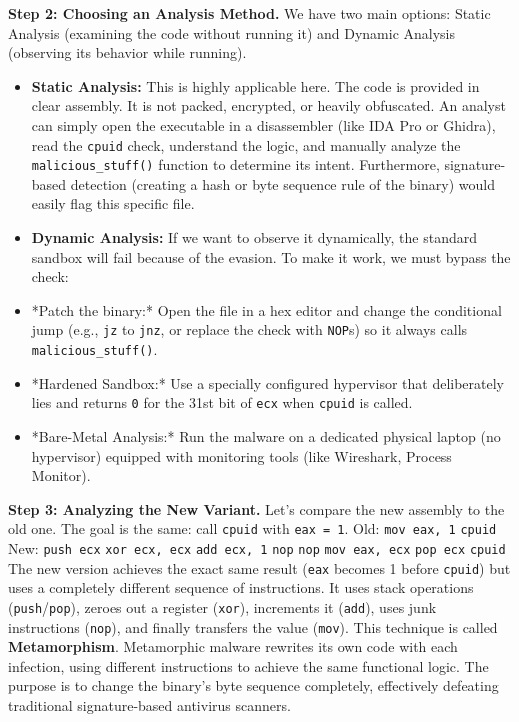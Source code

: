 \documentclass{article}
\begin{document}
\textbf{Step 2: Choosing an Analysis Method.}
We have two main options: Static Analysis (examining the code without running it) and Dynamic Analysis (observing its behavior while running).
\begin{itemize}
    \item \textbf{Static Analysis:} This is highly applicable here. The code is provided in clear assembly. It is not packed, encrypted, or heavily obfuscated. An analyst can simply open the executable in a disassembler (like IDA Pro or Ghidra), read the \texttt{cpuid} check, understand the logic, and manually analyze the \texttt{malicious\_stuff()} function to determine its intent. Furthermore, signature-based detection (creating a hash or byte sequence rule of the binary) would easily flag this specific file.
    \item \textbf{Dynamic Analysis:} If we want to observe it dynamically, the standard sandbox will fail because of the evasion. To make it work, we must bypass the check:
    \item[\textbf{1.}] *Patch the binary:* Open the file in a hex editor and change the conditional jump (e.g., \texttt{jz} to \texttt{jnz}, or replace the check with \texttt{NOP}s) so it always calls \texttt{malicious\_stuff()}.
    \item[\textbf{2.}] *Hardened Sandbox:* Use a specially configured hypervisor that deliberately lies and returns \texttt{0} for the 31st bit of \texttt{ecx} when \texttt{cpuid} is called.
    \item[\textbf{3.}] *Bare-Metal Analysis:* Run the malware on a dedicated physical laptop (no hypervisor) equipped with monitoring tools (like Wireshark, Process Monitor).

\end{itemize}
\textbf{Step 3: Analyzing the New Variant.}
Let's compare the new assembly to the old one. The goal is the same: call \texttt{cpuid} with \texttt{eax = 1}.
Old:
\texttt{mov eax, 1}
\texttt{cpuid}
New:
\texttt{push ecx}
\texttt{xor ecx, ecx}
\texttt{add ecx, 1}
\texttt{nop}
\texttt{nop}
\texttt{mov eax, ecx}
\texttt{pop ecx}
\texttt{cpuid}
The new version achieves the exact same result (\texttt{eax} becomes 1 before \texttt{cpuid}) but uses a completely different sequence of instructions. It uses stack operations (\texttt{push}/\texttt{pop}), zeroes out a register (\texttt{xor}), increments it (\texttt{add}), uses junk instructions (\texttt{nop}), and finally transfers the value (\texttt{mov}).
This technique is called \textbf{Metamorphism}. Metamorphic malware rewrites its own code with each infection, using different instructions to achieve the same functional logic. The purpose is to change the binary's byte sequence completely, effectively defeating traditional signature-based antivirus scanners.
\end{document}
